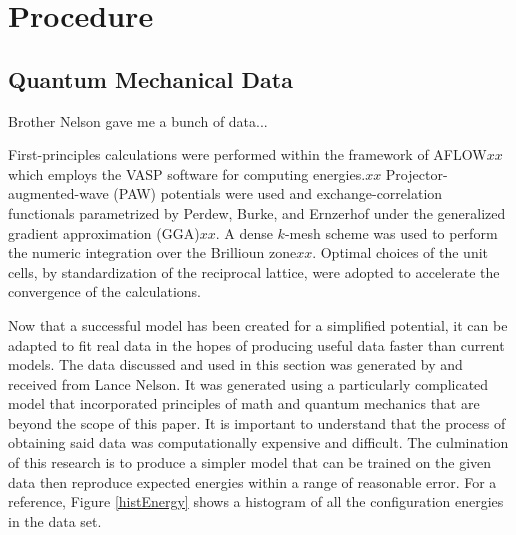 \section{Procedure} \label{Sect:procedure}
\subsection{Quantum Mechanical Data}\label{Sect:procedureData}
%
%
%
%
%
%
%
%
\par Brother Nelson gave me a bunch of data...
\par First-principles calculations were performed within the framework of AFLOW$xx$ which employs the VASP software for computing energies.$xx$ Projector-augmented-wave (PAW) potentials were used and exchange-correlation functionals parametrized by Perdew, Burke, and Ernzerhof under the generalized gradient approximation (GGA)$xx$. A dense $k$-mesh scheme was used to perform the numeric integration over the Brillioun zone$xx$. Optimal choices of the unit cells, by standardization of the reciprocal lattice, were adopted to accelerate the convergence of the calculations.
\par Now that a successful model has been created for a simplified potential, it can be adapted to fit real data in the hopes of producing useful data faster than current models. The data discussed and used in this section was generated by and received from Lance Nelson. It was generated using a particularly complicated model that incorporated principles of math and quantum mechanics that are beyond the scope of this paper. It is important to understand that the process of obtaining said data was computationally expensive and difficult. The culmination of this research is to produce a simpler model that can be trained on the given data then reproduce expected energies within a range of reasonable error. For a reference, Figure \ref{histEnergy} shows a histogram of all the configuration energies in the data set.

